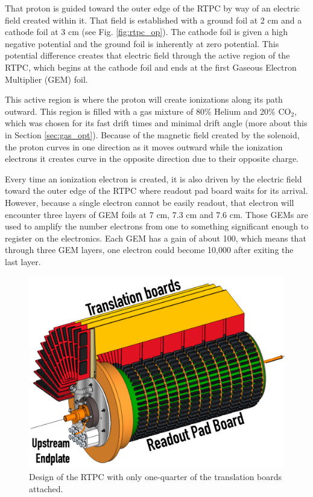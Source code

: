 That proton is guided toward the outer edge of the RTPC by way of an electric field created within it. That field is established with a ground foil at 2 cm and a cathode foil at 3 cm (see Fig. \ref{fig:rtpc_op}). The cathode foil is given a high negative potential and the ground foil is inherently at zero potential. This potential difference creates that electric field through the active region of the RTPC, which begins at the cathode foil and ends at the first Gaseous Electron Multiplier (GEM) foil. 

This active region is where the proton will create ionizations along its path outward. This region is filled with a gas mixture of 80$\%$ Helium and 20$\%$ CO$_2$, which was chosen for its fast drift times and minimal drift angle (more about this in Section \ref{sec:gas_opt}). Because of the magnetic field created by the solenoid, the proton curves in one direction as it moves outward while the ionization electrons it creates curve in the opposite direction due to their opposite charge.

Every time an ionization electron is created, it is also driven by the electric field toward the outer edge of the RTPC where readout pad board waits for its arrival. However, because a single electron cannot be easily readout, that electron will encounter three layers of GEM foils at 7 cm, 7.3 cm and 7.6 cm. Those GEMs are used to amplify the number electrons from one to something significant enough to register on the electronics. Each GEM has a gain of about 100, which means that through three GEM layers, one electron could become 10,000 after exiting the last layer.

\begin{figure}[h!]
	\centering
	\includegraphics[width=0.8\linewidth]{figures/rtpc_design.png}
	\caption{Design of the RTPC with only one-quarter of the translation boards attached.}
	\label{fig:rtpc_design}
\end{figure}

